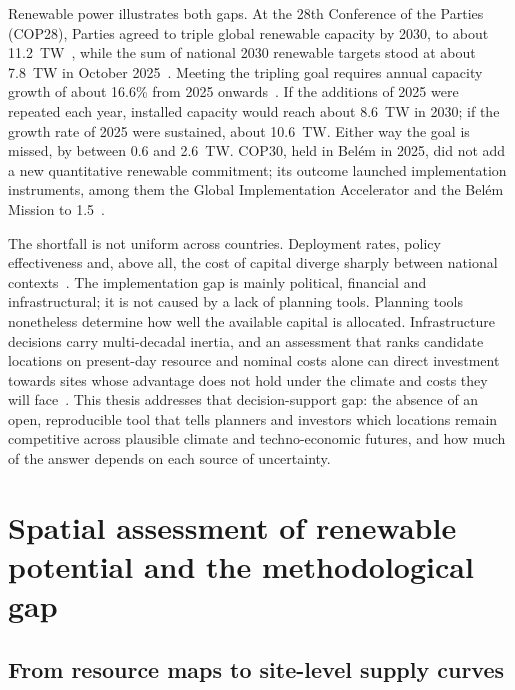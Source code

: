 Renewable power illustrates both gaps. At the 28th Conference of the Parties (COP28), Parties agreed to triple global renewable capacity by 2030, to about 11.2~TW~\cite{UNFCCC2023COP28, irena_uae_consensus2025}, %
while the sum of national 2030 renewable targets stood at about 7.8~TW in October 2025~\cite{ember2025tripling}. %
Meeting the tripling goal requires annual capacity growth of about 16.6\% from 2025 onwards~\cite{irena_uae_consensus2025}. If the additions of 2025 were repeated each year, installed capacity would reach about 8.6~TW in 2030; if the growth rate of 2025 were sustained, about 10.6~TW. Either way the goal is missed, by between 0.6 and 2.6~TW. COP30, held in Bel\'em in 2025, did not add a new quantitative renewable commitment; its outcome launched implementation instruments, among them the Global Implementation Accelerator and the Bel\'em Mission to 1.5~\cite{unfccc_cop30}. %

The shortfall is not uniform across countries. Deployment rates, policy effectiveness and, above all, the cost of capital diverge sharply between national contexts~\cite{steffen2020_cost_of_capital, IRENA_World_energy_transitions_outlook_2024}. The implementation gap is mainly political, financial and infrastructural; it is not caused by a lack of planning tools. Planning tools nonetheless determine how well the available capital is allocated. Infrastructure decisions carry multi-decadal inertia, and an assessment that ranks candidate locations on present-day resource and nominal costs alone can direct investment towards sites whose advantage does not hold under the climate and costs they will face~\cite{Workman2021Climate, Yazdanie2025Strengthening}. This thesis addresses that decision-support gap: the absence of an open, reproducible tool that tells planners and investors which locations remain competitive across plausible climate and techno-economic futures, and how much of the answer depends on each source of uncertainty.

\section{Spatial assessment of renewable potential and the methodological gap}
\label{sec:transition}

\subsection{From resource maps to site-level supply curves}

